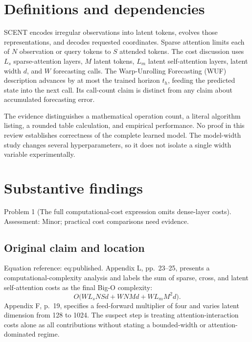 \documentclass[10pt]{article}
\begin{document}
\section*{Definitions and dependencies}
SCENT encodes irregular observations into latent tokens, evolves those representations, and decodes requested coordinates. Sparse attention limits each of \(N\) observation or query tokens to \(S\) attended tokens. The cost discussion uses \(L_s\) sparse-attention layers, \(M\) latent tokens, \(L_m\) latent self-attention layers, latent width \(d\), and \(W\) forecasting calls. The Warp-Unrolling Forecasting (WUF) description advances by at most the trained horizon \(t_h\), feeding the predicted state into the next call. Its call-count claim is distinct from any claim about accumulated forecasting error.\par
The evidence distinguishes a mathematical operation count, a literal algorithm listing, a rounded table calculation, and empirical performance. No proof in this review establishes correctness of the complete learned model. The model-width study changes several hyperparameters, so it does not isolate a single width variable experimentally.\par
\section*{Substantive findings}
Problem 1 (The full computational-cost expression omits dense-layer costs).  Assessment: Minor; practical cost comparisons need evidence.\par
\subsection*{Original claim and location}
Equation reference: eq:published. Appendix L, pp. 23–25, presents a computational-complexity analysis and labels the sum of sparse, cross, and latent self-attention costs as the final Big-O complexity: \[
O\bigl(WL_sNSd+WNMd+WL_mM^2d\bigr).\] Appendix F, p. 19, specifies a feed-forward multiplier of four and varies latent dimension from 128 to 1024. The suspect step is treating attention-interaction costs alone as all contributions without stating a bounded-width or attention-dominated regime.\par
\end{document}
